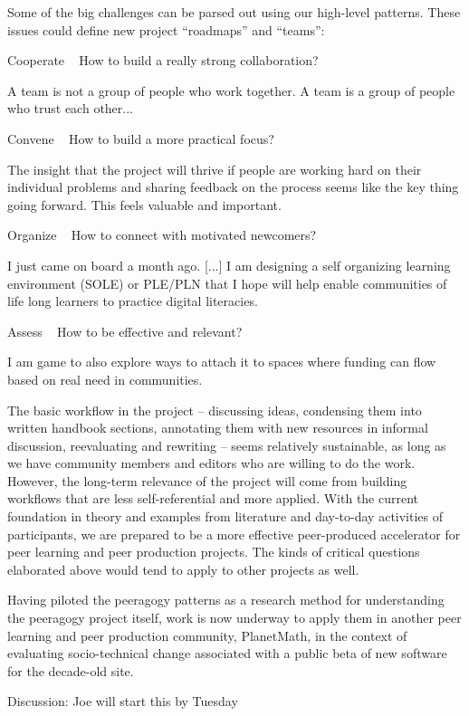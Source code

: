 \documentclass{acm_proc_article-sp}
\begin{document}
Some of the big challenges can be parsed out using our high-level patterns. These issues could define new project ``roadmaps'' and ``teams'':

    Cooperate ~ How to build a really strong collaboration?

        A team is not a group of people who work together. A team is a group of people who trust each other...

    Convene ~ How to build a more practical focus?

        The insight that the project will thrive if people are working hard on their individual problems and sharing feedback on the process seems like the key thing going forward. This feels valuable and important.

    Organize ~ How to connect with motivated newcomers?

        I just came on board a month ago. [...] I am designing a self organizing learning environment (SOLE) or PLE/PLN that I hope will help enable communities of life long learners to practice digital literacies.

    Assess ~ How to be effective and relevant?

        I am game to also explore ways to attach it to spaces where funding can flow based on real need in communities.

The basic workflow in the project -- discussing ideas, condensing them into written handbook sections, annotating them with new resources in informal discussion, reevaluating and rewriting -- seems relatively sustainable, as long as we have community members and editors who are willing to do the work. However, the long-term relevance of the project will come from building workflows that are less self-referential and more applied. With the current foundation in theory and examples from literature and day-to-day activities of participants, we are prepared to be a more effective peer-produced accelerator for peer learning and peer production projects. The kinds of critical questions elaborated above would tend to apply to other projects as well.

Having piloted the peeragogy patterns as a research method for understanding the peeragogy project itself, work is now underway to apply them in another peer learning and peer production community, PlanetMath, in the context of evaluating socio-technical change associated with a public beta of new software for the decade-old site.

Discussion: Joe will start this by Tuesday
\end{document}
